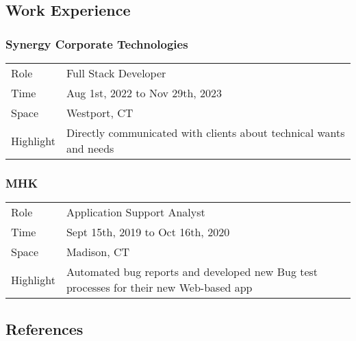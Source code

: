 \documentclass[letterpaper]{article}
\begin{document}
\hypertarget{work-experience}{%
\subsection{Work Experience}\label{work-experience}}

\hypertarget{synergy-corporate-technologies}{%
\subsubsection{Synergy Corporate
Technologies}\label{synergy-corporate-technologies}}

\begin{longtable}[]{@{}
  >{\raggedright\arraybackslash}p{}
  >{\raggedright\arraybackslash}p{}@{}}
\toprule\noalign{}
\endhead
\bottomrule\noalign{}
\endlastfoot
Role & Full Stack Developer \\
Time & Aug 1st, 2022 to Nov 29th, 2023 \\
Space & Westport, CT \\
Highlight & Directly communicated with clients about technical wants and
needs \\
\end{longtable}

\hypertarget{mhk}{%
\subsubsection{MHK}\label{mhk}}

\begin{longtable}[]{@{}
  >{\raggedright\arraybackslash}p{}
  >{\raggedright\arraybackslash}p{}@{}}
\toprule\noalign{}
\endhead
\bottomrule\noalign{}
\endlastfoot
Role & Application Support Analyst \\
Time & Sept 15th, 2019 to Oct 16th, 2020 \\
Space & Madison, CT \\
Highlight & Automated bug reports and developed new Bug test processes
for their new Web-based app \\
\end{longtable}

\hypertarget{references}{%
\subsection{References}\label{references}}
\end{document}

